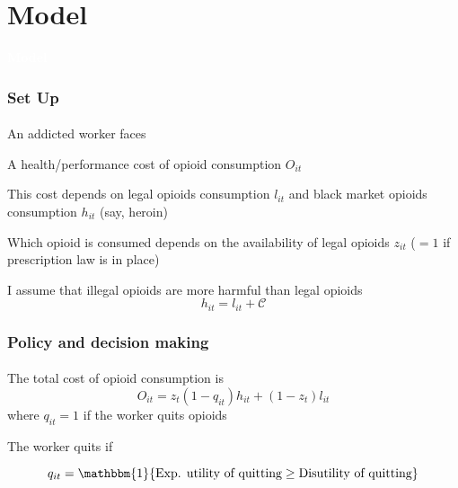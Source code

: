 \section{Model}

\begin{transitionframe}

    \rmfamily %
    
    \begin{center}
    {\Huge \textbf{\textcolor{white}{Model}}}
    \end{center}
  
\end{transitionframe}

\begin{frame}

    \frametitle{Set Up} %
    \framesubtitle{}  %
    \rmfamily %

    An addicted worker faces
    \vspace{9pt}
    \begin{wideitemize}
        \item A health/performance \textcolor{fblu}{cost of opioid consumption} \(O_{it}\)
        \item This cost depends on \textcolor{fblu}{legal opioids consumption} \(l_{it}\) and \textcolor{fblu}{black market opioids consumption} \(h_{it}\) (say, heroin)
        \item Which opioid is consumed depends on the \textcolor{fblu}{availability of legal opioids} \(z_{it}\) (\(= 1\) if prescription law is in place)
        \item I assume that illegal opioids are more harmful than legal opioids 
        \[h_{it} = l_{it} + \mathcal{C}\]
    \end{wideitemize}

\end{frame}

\begin{frame}

    \label{decision_making}
    \frametitle{Policy and decision making} %
    \framesubtitle{}  %
    \rmfamily %

    \begin{wideitemize}
        \item The \textcolor{fblu}{total cost of opioid consumption} is
        \[
        O_{it} = z_{t}\left(1-q_{it}\right)h_{it} + (1-z_{t})l_{it}
        \]
        where \(q_{it} = 1\) \textcolor{fblu}{if the worker quits opioids}
        \item The worker quits if
        
        \[
        q_{it} = \mathbbm{1}\{\text{Exp. utility of quitting} \geq \text{Disutility of quitting}\}
        \]

    \end{wideitemize}
    \hyperlink{quitting}{}    

\end{frame}


